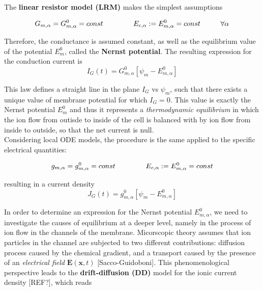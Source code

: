 \documentclass[a4paper]{article}
\begin{document}
The \textbf{linear resistor model (LRM)} makes the simplest assumptions 

\begin{equation}
	G_{m,\alpha} = G_{m,\alpha}^0 = const \hspace{1.5 cm} E_{c,\alpha} := E_{m,\alpha}^0 = const \hspace{1cm} \forall \alpha
\end{equation}

Therefore, the conductance is assumed constant, as well as the equilibrium value of the potential $E_m^0 $, called the \textbf{Nernst potential}.
The resulting expression for the conduction current is
\begin{equation}
	I_G(t) = G_{m,\alpha}^0 [\psi_m -  E_{m,\alpha}^0]
\end{equation}

This law defines a straight line in the plane $I_G$ vs $\psi_m$, such that there exists a unique value of membrane potential for which $I_G=0$. This value is exactly the Nernst potential $E_m^0$ and thus it represents a \textit{thermodynamic equilibrium} in which the ion flow from outisde to inside of the cell is balanced with by ion flow from inside to outside, so that the net current is null.\\
Considering local ODE models, the procedure is the same applied to the specific electrical quantities:

\begin{equation}
g_{m,\alpha} = g_{m,\alpha}^0 = const \hspace{1.5 cm} E_{c,\alpha} := E_{m,\alpha}^0 =const 
\end{equation}

resulting in a current density
\begin{equation}
J_G(t) = g_{m,\alpha}^0 [\psi_m -  E_{m,\alpha}^0]
\end{equation}


In order to determine an expression for the Nernst potential $E_{m,\alpha}^0$, we need to investigate the causes of equilibrium at a deeper level, namely in the process of ion flow in the channels of the membrane. Micorscopic theory assumes that ion particles in the channel are subjected to two different contributions: diffusion process caused by the chemical gradient, and a transport caused by the presence of an \textit{electrical field} $\textbf{E}(\textbf{x},t)$ [Sacco-Guidoboni]. This phenomenological perspective leads to the \textbf{drift-diffusion (DD)} model for the ionic current density [REF?], which reads
\end{document}
